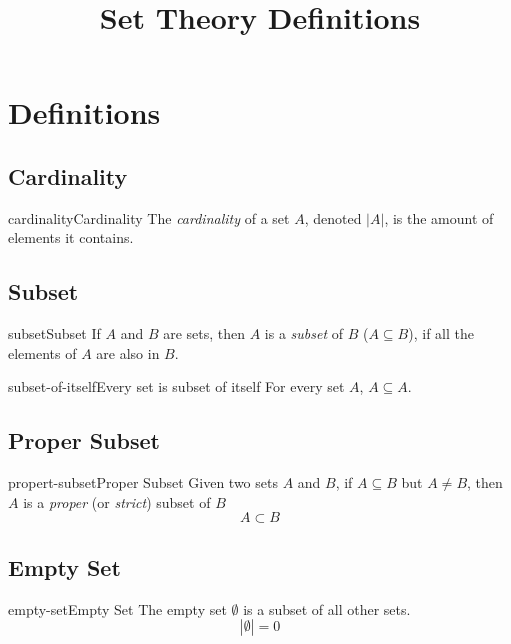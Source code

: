 \documentclass[preview]{standalone}
\begin{document}
\title{Set Theory Definitions}
\genpage


\section{Definitions}

\subsection{Cardinality}

\begin{snippetdefinition}{cardinality}{Cardinality}{
    The \textit{cardinality} of a set \(A\), denoted \(|A|\),
    is the amount of elements it contains.
}
\end{snippetdefinition}

\subsection{Subset}

\begin{snippetdefinition}{subset}{Subset}{
    If \(A\) and \(B\) are sets, then \(A\) is a \textit{subset} of \(B\)
    (\(A\subseteq B\)), if all the elements of \(A\) are also in \(B\).
}
\end{snippetdefinition}

\begin{snippetcorollary}{subset-of-itself}{Every set is subset of itself}{
    For every set \(A\), \(A \subseteq A\).
}
\end{snippetcorollary}

\subsection{Proper Subset}

\begin{snippetdefinition}{propert-subset}{Proper Subset}{
    Given two sets \(A\) and \(B\), if \(A \subseteq B\) but \(A \neq B\),
    then \(A\) is a \textit{proper} (or \textit{strict}) subset of \(B\)
    \[
        A \subset B
    \]
}
\end{snippetdefinition}

\subsection{Empty Set}

\begin{snippetdefinition}{empty-set}{Empty Set}{
    The empty set \(\emptyset\) is a subset of all other sets.
    \[
        |\emptyset|=0
    \]
}
\end{snippetdefinition}
\end{document}
